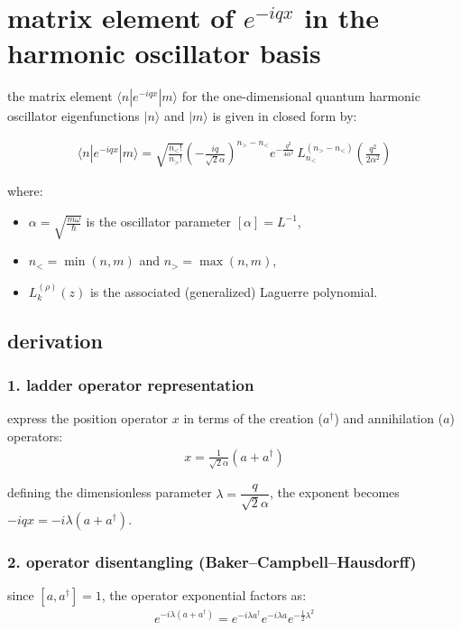 

\section{matrix element of \texorpdfstring{$e^{-iqx}$}{e\textsuperscript{-iqx}} in the harmonic oscillator basis}

the matrix element $\langle n | e^{-iqx} | m \rangle$ for the one-dimensional quantum harmonic oscillator eigenfunctions $|n\rangle$ and $|m\rangle$ is given in closed form by:

\begin{align}
  \langle n | e^{-iqx} | m \rangle = \sqrt{\frac{n_<!}{n_>!}} \left(-\frac{i q }{\sqrt{2}\alpha }\right)^{n_> - n_<} e^{-\frac{q^2 }{4\alpha ^2}} \, L_{n_<}^{(n_> - n_<)}\!\left(\frac{q^2 }{2\alpha ^2}\right)\label{eq:osc-me-expiqx}
\end{align}

\noindent where:
\begin{itemize}
  \item $\alpha  = \sqrt{\frac{m\omega}{\hbar}}$ is the oscillator parameter $[\alpha]=L^{-1}$,
  \item $n_< = \min(n, m)$ and $n_> = \max(n, m)$,
  \item $L_k^{(\rho)}(z)$ is the associated (generalized) Laguerre polynomial.
\end{itemize}

\subsection{derivation}

\subsubsection{1. ladder operator representation}
express the position operator $x$ in terms of the creation ($a^\dagger$) and annihilation ($a$) operators:
\begin{align}
  x = \frac{1}{\sqrt{2} \alpha } (a + a^\dagger)
\end{align}

defining the dimensionless parameter $\lambda = \dfrac{q }{\sqrt{2}\alpha }$, the exponent becomes $-i q x = -i \lambda (a + a^\dagger)$.

\subsubsection{2. operator disentangling (Baker--Campbell--Hausdorff)}
since $[a, a^\dagger] = 1$, the operator exponential factors as:
\begin{align}
  e^{-i \lambda (a + a^\dagger)} = e^{-i \lambda a^\dagger} e^{-i \lambda a} e^{-\frac{1}{2} \lambda^2}
\end{align}

